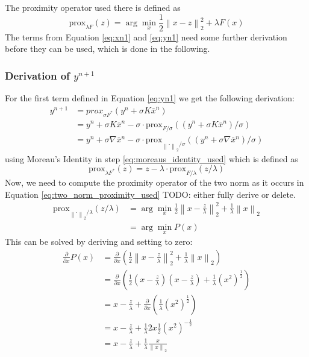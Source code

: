 \documentclass{paper}
\newcommand{\prox}{\text{prox}}
\newcommand{\twonorm}[1]{\left\lVert#1\right\rVert_2}
\begin{document}
The proximity operator used there is defined as 
\begin{equation}
	\prox_{\lambda F}(z) = \arg \min_x \frac{1}{2} \twonorm{x - z}^2 + \lambda F(x)
\end{equation}
The terms from Equation \eqref{eq:xn1} and \eqref{eq:yn1} need some further derivation
before they can be used, which is done in the following.

\subsubsection*{Derivation of $y^{n+1}$}
For the first term defined in Equation \eqref{eq:yn1} we get the following derivation:
\begin{align}
	y^{n+1} &= prox_{\sigma F^*}(y^n + \sigma K \bar{x}^n) \\
			&= y^n + \sigma K \bar{x}^n - 
				\sigma \cdot \prox_{F / \sigma}((y^n + \sigma K \bar{x}^n) / \sigma) 
				\label{eq:moreaus_identity_used} \\
			&= y^n + \sigma \nabla \bar{x}^n - 
				\sigma \cdot \prox_{\twonorm{\cdot} / \sigma}((y^n + \sigma \nabla \bar{x}^n) / \sigma)
				\label{eq:two_norm_proximity_used}
\end{align}
using Moreau's Identity in step \eqref{eq:moreaus_identity_used} which is defined as
\begin{equation}
	\prox_{\lambda F^*}(z) = z - \lambda \cdot \prox_{F/ \lambda}(z / \lambda) 
\end{equation}
Now, we need to compute the proximity operator of the two norm as it 
occurs in Equation \eqref{eq:two_norm_proximity_used} TODO: either fully derive or delete.
\begin{align}
	\prox_{\twonorm{\cdot} / \lambda}(z / \lambda) 
	&= \arg \min_x \frac{1}{2} \twonorm{x - \frac{z}{\lambda}}^2 +
	\frac{1}{\lambda} \twonorm{x} \\
	&= \arg \min_x P(x)
\end{align}
This can be solved by deriving and setting to zero:
\begin{align*}
\frac{\partial}{\partial x} P(x) &= 
	\frac{\partial}{\partial x} \left(
 		\frac{1}{2} \twonorm{x - \frac{z}{\lambda}}^2 +
		\frac{1}{\lambda} \twonorm{x} 
	\right) \\
&= 
	\frac{\partial}{\partial x} \left(
		\frac{1}{2} (x-\frac{z}{\lambda}) (x-\frac{z}{\lambda}) + 
		\frac{1}{\lambda} (x^2)^{\frac{1}{2}}
	\right) \\
&= 
	x-\frac{z}{\lambda} + 
	\frac{\partial}{\partial x} \left(
		\frac{1}{\lambda} (x^2)^{\frac{1}{2}}
	\right) \\
&= 
	x-\frac{z}{\lambda} + 
	\frac{1}{\lambda} 2x \frac{1}{2} (x^2)^{-\frac{1}{2}} \\
&= 
	x-\frac{z}{\lambda} + 
	\frac{1}{\lambda} \frac{x}{\twonorm{x}}
\end{align*}
\end{document}
